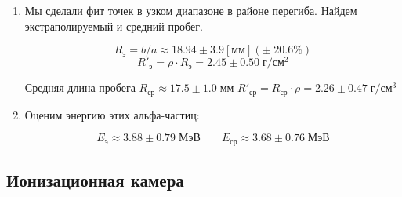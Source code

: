\documentclass[a4paper]{article}
\begin{document}
\begin{enumerate}
    \item 
    Мы сделали фит точек в узком диапазоне в районе перегиба. Найдем экстраполируемый и средний пробег. 

    $$R_э = b/a \approx 18.94 \pm 3.9 [мм] (\pm \; 20.6 \%)$$
    $$R'_{э} = \rho \cdot R_{э} = 2.45 \pm 0.50\; г/см^2 $$

    Средняя длина пробега $R_{ср} \approx 17.5 \pm 1.0 \; мм$ $R'_{ср} = R_{ср} \cdot \rho  = 2.26 \pm 0.47 \; г/см^3$ 

    \item Оценим энергию этих альфа-частиц:
    
    $$E_{э} \approx 3.88 \pm 0.79 \; МэВ \;\;\;\;\;\;\; E_{ср} \approx 3.68 \pm 0.76 \; МэВ$$

\end{enumerate}



\subsection{Ионизационная камера}
\end{document}
